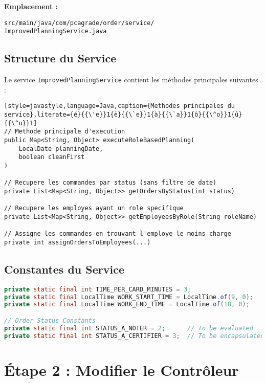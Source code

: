 \documentclass[11pt,a4paper]{article}
\begin{document}
    \textbf{Emplacement :}

    \noindent\texttt{\small src/main/java/com/pcagrade/order/service/\\ImprovedPlanningService.java}

    \subsection{Structure du Service}

    Le service \texttt{ImprovedPlanningService} contient les méthodes principales suivantes :

    \begin{lstlisting}[style=javastyle,language=Java,caption={Methodes principales du service},literate={é}{{\'e}}1{è}{{\`e}}1{à}{{\`a}}1{ô}{{\^o}}1{û}{{\^u}}1]
// Methode principale d'execution
public Map<String, Object> executeRoleBasedPlanning(
    LocalDate planningDate,
    boolean cleanFirst
)

// Recupere les commandes par status (sans filtre de date)
private List<Map<String, Object>> getOrdersByStatus(int status)

// Recupere les employes ayant un role specifique
private List<Map<String, Object>> getEmployeesByRole(String roleName)

// Assigne les commandes en trouvant l'employe le moins charge
private int assignOrdersToEmployees(...)
    \end{lstlisting}

    \subsection{Constantes du Service}

    \begin{lstlisting}[style=javastyle,language=Java]
private static final int TIME_PER_CARD_MINUTES = 3;
private static final LocalTime WORK_START_TIME = LocalTime.of(9, 0);
private static final LocalTime WORK_END_TIME = LocalTime.of(18, 0);

// Order Status Constants
private static final int STATUS_A_NOTER = 2;      // To be evaluated
private static final int STATUS_A_CERTIFIER = 3;  // To be encapsulated
    \end{lstlisting}

    \section{Étape 2 : Modifier le Contrôleur}
\end{document}
